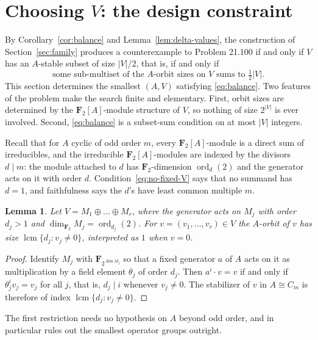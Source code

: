\documentclass[11pt]{article}
\newtheorem{lemma}[theorem]{Lemma}
\theoremstyle{definition}
\theoremstyle{remark}
\newcommand{\F}{\mathbf F}
\begin{document}
\section{Choosing \texorpdfstring{$V$}{V}: the design constraint}
\label{sec:design}

By Corollary~\ref{cor:balance} and Lemma~\ref{lem:delta-values}, the
construction of Section~\ref{sec:family} produces a counterexample to
Problem 21.100 if and only if $V$ has an $A$-stable subset of
size $|V|/2$, that is, if and only if
\begin{equation}\label{eq:balance}
 \text{some sub-multiset of the $A$-orbit sizes on $V$ sums to }
 \tfrac12|V| .
\end{equation}
This section determines the smallest $(A,V)$ satisfying
\eqref{eq:balance}.  Two features of the problem make the search
finite and elementary.  First, orbit sizes are determined by the
$\F_2[A]$-module structure of $V$, so nothing of size $2^{|V|}$ is ever
involved.  Second, \eqref{eq:balance} is a subset-sum condition on at
most $|V|$ integers.

Recall that for $A$ cyclic of odd order $m$, every $\F_2[A]$-module is
a direct sum of irreducibles, and the irreducible $\F_2[A]$-modules are
indexed by the divisors $d\mid m$: the module attached to $d$ has
$\F_2$-dimension $\operatorname{ord}_d(2)$ and the generator acts on it
with order $d$.  Condition~\eqref{eq:no-fixed-V} says that no
summand has $d=1$, and faithfulness says the $d$'s have least common
multiple $m$.

\begin{lemma}\label{lem:orbit-sizes-module}
Let $V=M_1\oplus\dots\oplus M_r$, where the generator acts on $M_j$
with order $d_j>1$ and $\dim_{\F_2}M_j=\operatorname{ord}_{d_j}(2)$.
For $v=(v_1,\dots,v_r)\in V$ the $A$-orbit of $v$ has size
$\operatorname{lcm}\{d_j:v_j\neq0\}$, interpreted as $1$ when $v=0$.
\end{lemma}

\begin{proof}
Identify $M_j$ with $\F_{2^{\dim M_j}}$ so that a fixed generator
$a$ of $A$ acts on it as multiplication by a field element
$\theta_j$ of order $d_j$.  Then $a^i\cdot v=v$ if and only if
$\theta_j^iv_j=v_j$ for all $j$, that is, $d_j\mid i$ whenever
$v_j\neq0$.  The stabilizer of $v$ in $A\cong C_m$ is therefore of
index $\operatorname{lcm}\{d_j:v_j\neq0\}$.
\end{proof}

The first restriction needs no hypothesis on $A$ beyond odd order, and
in particular rules out the smallest operator groups outright.
\end{document}
